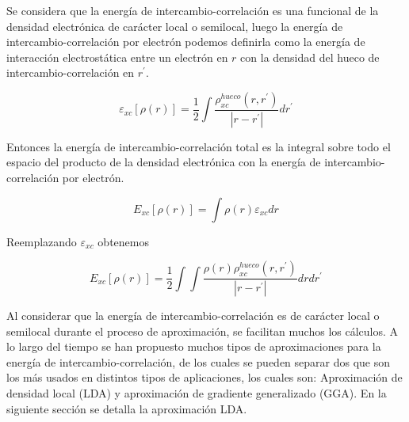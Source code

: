 \noindent Se considera que la energ\'ia de intercambio-correlaci\'on es una 
funcional de 
la densidad electr\'onica de car\'acter local o semilocal, luego la energ\'ia 
de intercambio-correlaci\'on por electr\'on podemos definirla como la energ\'ia 
de interacci\'on electrost\'atica entre un electr\'on en $r$ con la densidad  
del hueco de intercambio-correlaci\'on en $r^{\prime }$.

\begin{equation}
    \varepsilon _{xc} [\rho (r)] = \frac{1}{2} \int \frac{\rho 
    ^{hueco}_{xc}(r,r^{\prime })}{|r - r^{\prime }|} dr^{\prime }
\end{equation}

\noindent Entonces la energ\'ia de intercambio-correlaci\'on total es la 
integral sobre todo el espacio del producto de la densidad electr\'onica con la 
energ\'ia de intercambio-correlaci\'on por electr\'on.

\begin{equation}
    E_{xc} [\rho (r)] = \int \rho (r) \varepsilon_{xc} dr
\end{equation}

Reemplazando $\varepsilon_{xc}$ obtenemos

\begin{equation}
    E_{xc} [\rho (r)] = \frac{1}{2} \int \int \frac{\rho (r) \rho 
        ^{hueco}_{xc}(r,r^{\prime })}{|r - r^{\prime }|} dr dr^{\prime }
\end{equation}

\noindent Al considerar que la energ\'ia de intercambio-correlaci\'on es de 
car\'acter local o semilocal durante el proceso de aproximaci\'on, se facilitan 
muchos los c\'alculos. A lo largo del tiempo se han propuesto muchos tipos de 
aproximaciones para la energ\'ia de intercambio-correlaci\'on, de los cuales se 
pueden separar dos que son los m\'as usados en distintos tipos de aplicaciones, 
los cuales son: Aproximaci\'on de densidad local (LDA) y aproximaci\'on de 
gradiente generalizado (GGA). En la siguiente secci\'on se detalla la 
aproximaci\'on LDA.